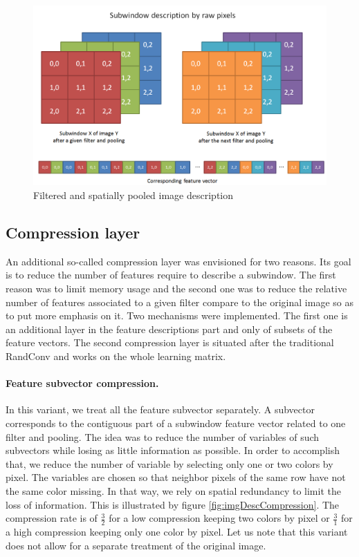 \documentclass[a4paper]{report}
\begin{document}
	\begin{figure}
		\centering
			\includegraphics[width=1.0\textwidth]{images/imgDesc.png}
		\caption{\label{fig:imgDesc}Filtered and spatially pooled image description}
	\end{figure}
		
		\subsection{Compression layer}
		An additional so-called compression layer was envisioned for two reasons. Its goal is to reduce the number of features require to describe a subwindow. The first reason was to limit memory usage and the second one was to reduce the relative number of features associated to a given filter compare to the original image so as to put more emphasis on it.
		Two mechanisms were implemented. The first one is an additional layer in the feature descriptions part and only of subsets of the  feature vectors. The second compression layer is situated after the traditional RandConv and works on the whole learning matrix.
		
		\paragraph{Feature subvector compression.}
		In this variant, we treat all the feature subvector separately. A subvector corresponds to the contiguous part of a subwindow feature vector related to one filter and pooling. The idea was to reduce the number of variables of such subvectors while losing as little information as possible. In order to accomplish that, we reduce the number of variable by selecting only one or two colors by pixel. The variables are chosen so that neighbor pixels of the same row have not the same color missing. In that way, we rely on spatial redundancy to limit the loss of information. This is illustrated by figure \ref{fig:imgDescCompression}. The compression rate is of $\frac{3}{2}$ for a low compression keeping two colors by pixel or $\frac{3}{1}$ for a high compression keeping only one color by pixel.
		Let us note that this variant does not allow for a separate treatment of the original image.
		
\end{document}

